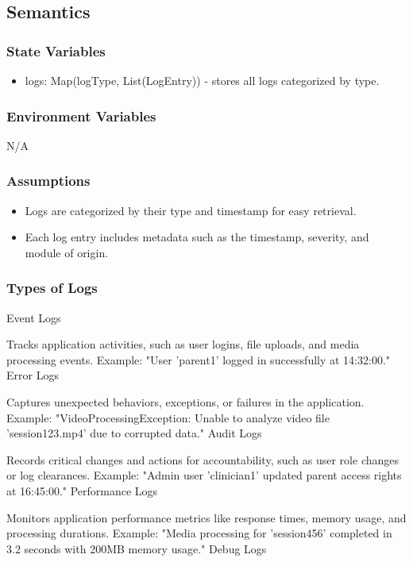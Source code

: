 \documentclass[12pt, titlepage]{article}
\begin{document}
\subsection{Semantics}

\subsubsection{State Variables}
\begin{itemize}
\item logs: Map(logType, List(LogEntry)) - stores all logs categorized by type.
\end{itemize}

\subsubsection{Environment Variables}
N/A

\subsubsection{Assumptions}
\begin{itemize}
\item Logs are categorized by their type and timestamp for easy retrieval.
\item Each log entry includes metadata such as the timestamp, severity, and module of origin.
\end{itemize}

\subsubsection{Types of Logs}

Event Logs

Tracks application activities, such as user logins, file uploads, and media processing events.
Example: "User 'parent1' logged in successfully at 14:32:00."
Error Logs

Captures unexpected behaviors, exceptions, or failures in the application.
Example: "VideoProcessingException: Unable to analyze video file 'session123.mp4' due to corrupted data."
Audit Logs

Records critical changes and actions for accountability, such as user role changes or log clearances.
Example: "Admin user 'clinician1' updated parent access rights at 16:45:00."
Performance Logs

Monitors application performance metrics like response times, memory usage, and processing durations.
Example: "Media processing for 'session456' completed in 3.2 seconds with 200MB memory usage."
Debug Logs
\end{document}
